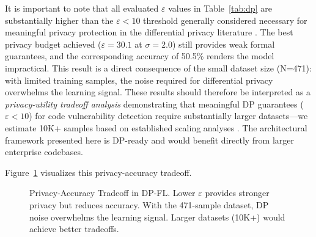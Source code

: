 \documentclass[pdflatex,sn-mathphys-num]{sn-jnl}
\theoremstyle{thmstyleone}%
\theoremstyle{thmstyletwo}%
\theoremstyle{thmstylethree}%
\begin{document}
It is important to note that all evaluated $\varepsilon$ values in Table~\ref{tab:dp} are substantially higher than the $\varepsilon < 10$ threshold generally considered necessary for meaningful privacy protection in the differential privacy literature \cite{abadi2024dpsgd}. The best privacy budget achieved ($\varepsilon = 30.1$ at $\sigma = 2.0$) still provides weak formal guarantees, and the corresponding accuracy of 50.5\% renders the model impractical. This result is a direct consequence of the small dataset size (N=471): with limited training samples, the noise required for differential privacy overwhelms the learning signal. These results should therefore be interpreted as a \textit{privacy-utility tradeoff analysis} demonstrating that meaningful DP guarantees ($\varepsilon < 10$) for code vulnerability detection require substantially larger datasets---we estimate 10K+ samples based on established scaling analyses \cite{zhang2024dpml}. The architectural framework presented here is DP-ready and would benefit directly from larger enterprise codebases.

Figure~\ref{fig:privacy_tradeoff} visualizes this privacy-accuracy tradeoff.

\begin{figure}[h]
\centering
{}
\caption{Privacy-Accuracy Tradeoff in DP-FL. Lower $\varepsilon$ provides stronger privacy but reduces accuracy. With the 471-sample dataset, DP noise overwhelms the learning signal. Larger datasets (10K+) would achieve better tradeoffs.}
\label{fig:privacy_tradeoff}
\end{figure}
\end{document}
